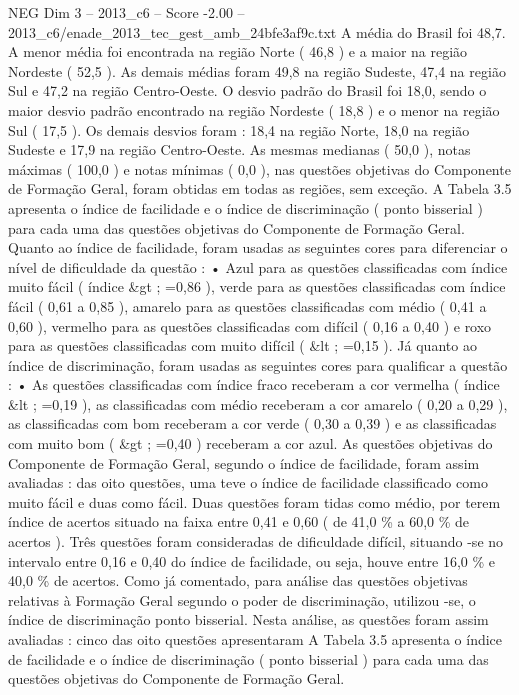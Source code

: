 \begin{textsample}{NEG Dim 3 – 2013\_c6 – Score -2.00 – 2013\_c6/enade\_2013\_tec\_gest\_amb\_24bfe3af9c.txt}
A média do Brasil foi 48,7.
A menor média foi encontrada na região Norte ( 46,8 ) e a maior na região Nordeste ( 52,5 ).
As demais médias foram 49,8 na região Sudeste, 47,4 na região Sul e 47,2 na região Centro-Oeste.
O desvio padrão do Brasil foi 18,0, sendo o maior desvio padrão encontrado na região Nordeste ( 18,8 ) e o menor na região Sul ( 17,5 ).
Os demais desvios foram : 18,4 na região Norte, 18,0 na região Sudeste e 17,9 na região Centro-Oeste.
As mesmas medianas ( 50,0 ), notas máximas ( 100,0 ) e notas mínimas ( 0,0 ), nas questões objetivas do Componente de Formação Geral, foram obtidas em todas as regiões, sem exceção.
A Tabela 3.5 apresenta o índice de facilidade e o índice de discriminação ( ponto bisserial ) para cada uma das questões objetivas do Componente de Formação Geral.
Quanto ao índice de facilidade, foram usadas as seguintes cores para diferenciar o nível de dificuldade da questão : • Azul para as questões classificadas com índice muito fácil ( índice \&gt ; =0,86 ), verde para as questões classificadas com índice fácil ( 0,61 a 0,85 ), amarelo para as questões classificadas com médio ( 0,41 a 0,60 ), vermelho para as questões classificadas com difícil ( 0,16 a 0,40 ) e roxo para as questões classificadas com muito difícil ( \&lt ; =0,15 ).
Já quanto ao índice de discriminação, foram usadas as seguintes cores para qualificar a questão : • As questões classificadas com índice fraco receberam a cor vermelha ( índice \&lt ; =0,19 ), as classificadas com médio receberam a cor amarelo ( 0,20 a 0,29 ), as classificadas com bom receberam a cor verde ( 0,30 a 0,39 ) e as classificadas com muito bom ( \&gt ; =0,40 ) receberam a cor azul.
As questões objetivas do Componente de Formação Geral, segundo o índice de facilidade, foram assim avaliadas : das oito questões, uma teve o índice de facilidade classificado como muito fácil e duas como fácil.
Duas questões foram tidas como médio, por terem índice de acertos situado na faixa entre 0,41 e 0,60 ( de 41,0 \% a 60,0 \% de acertos ).
Três questões foram consideradas de dificuldade difícil, situando -se no intervalo entre 0,16 e 0,40 do índice de facilidade, ou seja, houve entre 16,0 \% e 40,0 \% de acertos.
Como já comentado, para análise das questões objetivas relativas à Formação Geral segundo o poder de discriminação, utilizou -se, o índice de discriminação ponto bisserial.
Nesta análise, as questões foram assim avaliadas : cinco das oito questões apresentaram A Tabela 3.5 apresenta o índice de facilidade e o índice de discriminação ( ponto bisserial ) para cada uma das questões objetivas do Componente de Formação Geral.

\end{textsample}
